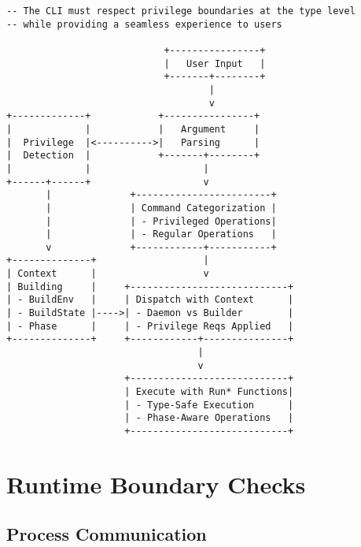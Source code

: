 \documentclass{article}
\begin{document}
\begin{tcolorbox}[title=CLI Privilege Enforcement Architecture]
\begin{verbatim}
-- The CLI must respect privilege boundaries at the type level
-- while providing a seamless experience to users

                            +----------------+
                            |   User Input   |
                            +-------+--------+
                                    |
                                    v
+-------------+            +----------------+
|             |            |   Argument     |
|  Privilege  |<---------->|   Parsing      |
|  Detection  |            +-------+--------+
|             |                    |
+------+------+                    v
       |              +------------------------+
       |              | Command Categorization |
       |              | - Privileged Operations|
       |              | - Regular Operations   |
       v              +------------+-----------+
+--------------+                   |
| Context      |                   v
| Building     |     +----------------------------+
| - BuildEnv   |     | Dispatch with Context      |
| - BuildState |---->| - Daemon vs Builder        |
| - Phase      |     | - Privilege Reqs Applied   |
+--------------+     +------------+---------------+
                                  |
                                  v
                     +----------------------------+
                     | Execute with Run* Functions|
                     | - Type-Safe Execution      |
                     | - Phase-Aware Operations   |
                     +----------------------------+
\end{verbatim}
\end{tcolorbox}

\newpage
\section{Runtime Boundary Checks}

\subsection{Process Communication}
\end{document}
